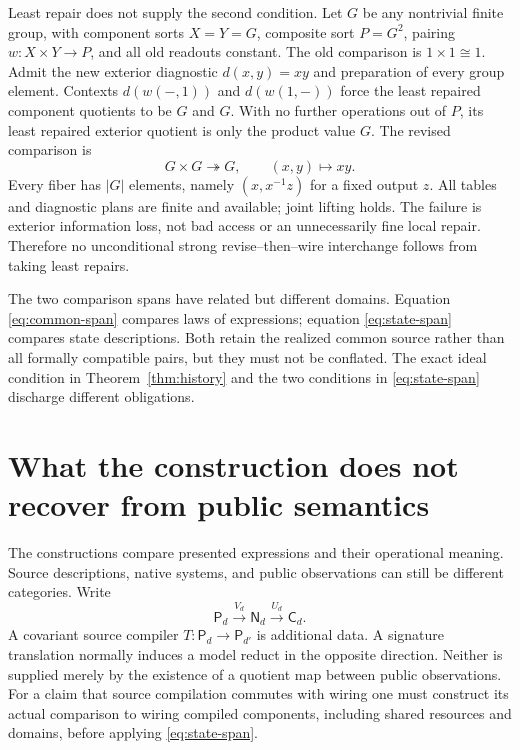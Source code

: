 \documentclass[11pt]{article}
\theoremstyle{definition}
\theoremstyle{remark}\newtheorem{remark}[theorem]{Remark}
\begin{document}
Least repair does not supply the second condition. Let $G$ be any nontrivial
finite group, with component sorts $X=Y=G$, composite sort $P=G^2$, pairing
$w:X\times Y\to P$, and all old readouts constant. The old comparison is
$1\times1\cong1$. Admit the new exterior diagnostic $d(x,y)=xy$ and
preparation of every group element. Contexts $d(w(-,1))$ and $d(w(1,-))$
force the least repaired component quotients to be $G$ and $G$. With no
further operations out of $P$, its least repaired exterior quotient is
only the product value $G$. The revised comparison is
\[
             G\times G\twoheadrightarrow G,\qquad(x,y)\mapsto xy.
\]
Every fiber has $|G|$ elements, namely $(x,x^{-1}z)$ for a fixed output $z$.
All tables and diagnostic plans are finite and available; joint lifting
holds. The failure is exterior information loss, not bad access or an
unnecessarily fine local repair. Therefore no unconditional strong
revise--then--wire interchange follows from taking least repairs.

The two comparison spans have related but different domains. Equation
\eqref{eq:common-span} compares laws of expressions; equation
\eqref{eq:state-span} compares state descriptions. Both retain the realized
common source rather than all formally compatible pairs, but they must not
be conflated. The exact ideal condition in Theorem~\ref{thm:history} and
the two conditions in \eqref{eq:state-span} discharge different obligations.


\section{What the construction does not recover from public semantics}
\label{sec:native}
The constructions compare presented expressions and their operational
meaning. Source descriptions, native systems, and public observations can
still be different categories. Write
\[
 \mathsf P_d\xrightarrow{V_d}\mathsf N_d\xrightarrow{U_d}\mathsf C_d.
\]
A covariant source compiler $T:\mathsf P_d\to\mathsf P_{d'}$ is additional
data. A signature translation normally induces a model reduct in the
opposite direction. Neither is supplied merely by the existence of a
quotient map between public observations. For a claim that source compilation
commutes with wiring one must construct its actual comparison to wiring
compiled components, including shared resources and domains, before applying
\eqref{eq:state-span}.
\end{document}
